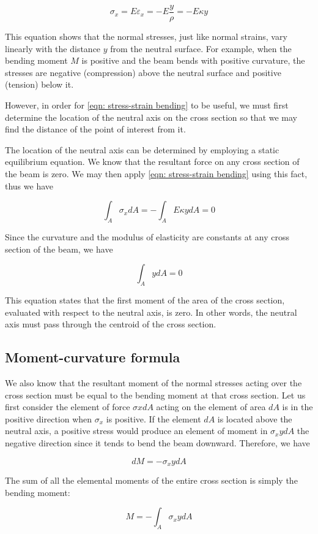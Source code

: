 \documentclass[a4paper,openany,12pt]{book}
\begin{document}
$$\sigma_x = E\varepsilon_x =  - E\frac{y}{\rho } =  - E\kappa y$$

This equation shows that the normal stresses, just like normal strains,
vary linearly with the distance \(y\) from the neutral surface. For
example, when the bending moment \(M\) is positive and the beam bends with
positive curvature, the stresses are negative (compression) above the
neutral surface and positive (tension) below it.

However, in order for \ref{eqn: stress-strain bending} to be
useful, we must first determine the location of the neutral axis on the
cross section so that we may find the distance of the point of interest
from it.

The location of the neutral axis can be determined by employing a static
equilibrium equation. We know that the resultant force on any cross
section of the beam is zero. We may then apply
\ref{eqn: stress-strain bending} using this
fact, thus we have

$$\int_A\sigma_x dA  =  - \int_A E\kappa ydA  = 0$$

Since the curvature and the modulus of elasticity are constants at any
cross section of the beam, we have

$$\int_A ydA = 0$$

This equation states that the first moment of the area of the cross
section, evaluated with respect to the neutral axis, is zero. In other
words, the neutral axis must pass through the centroid of the cross
section.

\subsection{Moment-curvature formula}
\label{moment-curvature-formula}
We also know that the resultant moment of the normal stresses acting
over the cross section must be equal to the bending moment at that cross
section. Let us first consider the element of force \(\sigma xdA\) acting
on the element of area \(dA\) is in the positive direction when \(\sigma_x\)
is positive. If the element \(dA\) is located above the neutral axis, a
positive stress would produce an element of moment in \(\sigma_xydA\) the
negative direction since it tends to bend the beam downward. Therefore,
we have


$$dM =  - \sigma _xydA$$

The sum of all the elemental moments of the entire cross section is
simply the bending moment:

$$M =  - \int_A \sigma_xydA$$
\end{document}
